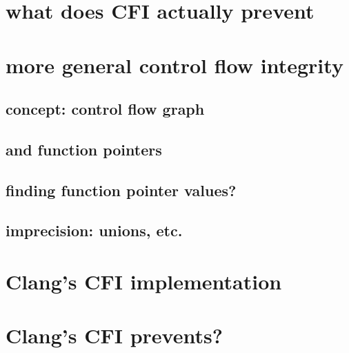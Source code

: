 \section{what does CFI actually prevent}

\section{more general control flow integrity}

\subsection{concept: control flow graph}

\subsection{and function pointers}


\subsection{finding function pointer values?}



\subsection{imprecision: unions, etc.}


\section{Clang's CFI implementation}


\section{Clang's CFI prevents?}




